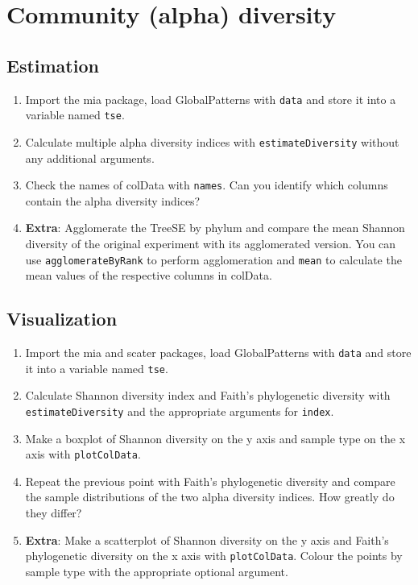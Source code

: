 \documentclass[
]{book}
\providecommand{\tightlist}{%
  \setlength{\itemsep}{0pt}\setlength{\parskip}{0pt}}
\begin{document}
\hypertarget{community-alpha-diversity}{%
\section{Community (alpha) diversity}\label{community-alpha-diversity}}

\hypertarget{estimation-1}{%
\subsection{Estimation}\label{estimation-1}}

\begin{enumerate}
\def\labelenumi{\arabic{enumi}.}
\tightlist
\item
  Import the mia package, load GlobalPatterns with \texttt{data} and store it into a
  variable named \texttt{tse}.
\item
  Calculate multiple alpha diversity indices with \texttt{estimateDiversity} without
  any additional arguments.
\item
  Check the names of colData with \texttt{names}. Can you identify which columns
  contain the alpha diversity indices?
\item
  \textbf{Extra}: Agglomerate the TreeSE by phylum and compare the mean Shannon
  diversity of the original experiment with its agglomerated version. You can
  use \texttt{agglomerateByRank} to perform agglomeration and \texttt{mean} to calculate the
  mean values of the respective columns in colData.
\end{enumerate}

\hypertarget{visualization-1}{%
\subsection{Visualization}\label{visualization-1}}

\begin{enumerate}
\def\labelenumi{\arabic{enumi}.}
\tightlist
\item
  Import the mia and scater packages, load GlobalPatterns with \texttt{data} and store
  it into a variable named \texttt{tse}.
\item
  Calculate Shannon diversity index and Faith's phylogenetic diversity with
  \texttt{estimateDiversity} and the appropriate arguments for \texttt{index}.
\item
  Make a boxplot of Shannon diversity on the y axis and sample type on the x
  axis with \texttt{plotColData}.
\item
  Repeat the previous point with Faith's phylogenetic diversity and compare the
  sample distributions of the two alpha diversity indices. How greatly do they
  differ?
\item
  \textbf{Extra}: Make a scatterplot of Shannon diversity on the y axis and Faith's
  phylogenetic diversity on the x axis with \texttt{plotColData}. Colour the points
  by sample type with the appropriate optional argument.
\end{enumerate}
\end{document}
